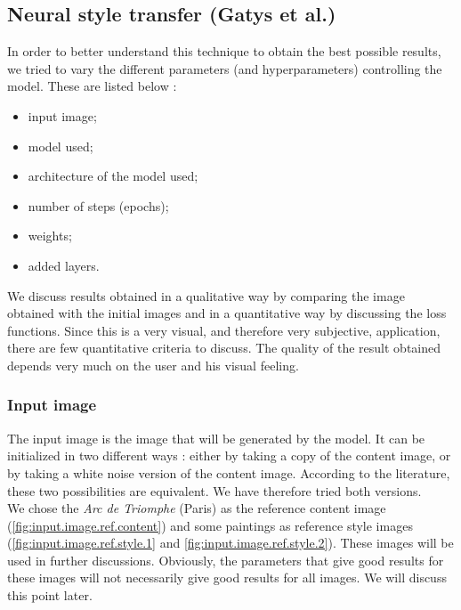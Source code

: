\documentclass[twocolumn,superscriptaddress,aps, floatfix]{revtex4-1}
\begin{document}
    \subsection{Neural style transfer (Gatys et al.)}\label{sec:results.gatys}
    
    In order to better understand this technique to obtain the best possible results, we tried to vary the different parameters (and hyperparameters) controlling the model. These are listed below :
    
    \begin{itemize}
        \item input image;
        \item model used;
        \item architecture of the model used;
        \item number of steps (epochs);
        \item weights;
        \item added layers.
    \end{itemize}
    
    We discuss results obtained in a qualitative way by comparing the image obtained with the initial images and in a quantitative way by discussing the loss functions. Since this is a very visual, and therefore very subjective, application, there are few quantitative criteria to discuss. The quality of the result obtained depends very much on the user and his visual feeling.
    
    \subsubsection{Input image}
    
    The input image is the image that will be generated by the model. It can be initialized in two different ways : either by taking a copy of the content image, or by taking a white noise version of the content image. According to the literature, these two possibilities are equivalent. We have therefore tried both versions.\\
    
    We chose the \emph{Arc de Triomphe} (Paris) as the reference content image (\ref{fig:input.image.ref.content}) and some paintings as reference style images (\ref{fig:input.image.ref.style.1} and \ref{fig:input.image.ref.style.2}). These images will be used in further discussions. Obviously, the parameters that give good results for these images will not necessarily give good results for all images. We will discuss this point later.
    
\end{document}
